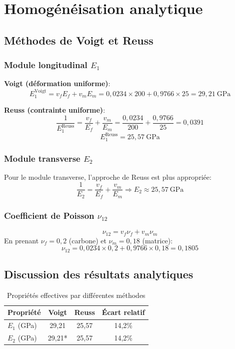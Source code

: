 \documentclass{rapportECL}
\begin{document}
\section{Homogénéisation analytique}

\subsection{Méthodes de Voigt et Reuss}

\subsubsection{Module longitudinal $E_1$}

\textbf{Voigt (déformation uniforme)}:
\[
E_1^{\text{Voigt}} = v_f E_f + v_m E_m = 0,0234 \times 200 + 0,9766 \times 25 = 29,21\ \si{\giga\pascal}
\]

\textbf{Reuss (contrainte uniforme)}:
\[
\frac{1}{E_1^{\text{Reuss}}} = \frac{v_f}{E_f} + \frac{v_m}{E_m} = \frac{0,0234}{200} + \frac{0,9766}{25} = 0,0391
\]
\[
E_1^{\text{Reuss}} = 25,57\ \si{\giga\pascal}
\]

\subsubsection{Module transverse $E_2$}

Pour le module transverse, l'approche de Reuss est plus appropriée:
\[
\frac{1}{E_2} = \frac{v_f}{E_f} + \frac{v_m}{E_m} \Rightarrow E_2 \approx 25,57\ \si{\giga\pascal}
\]

\subsubsection{Coefficient de Poisson $\nu_{12}$}

\[
\nu_{12} = v_f \nu_f + v_m \nu_m
\]
En prenant $\nu_f = 0,2$ (carbone) et $\nu_m = 0,18$ (matrice):
\[
\nu_{12} = 0,0234 \times 0,2 + 0,9766 \times 0,18 = 0,1805
\]

\subsection{Discussion des résultats analytiques}

\begin{table}[h]
\centering
\caption{Propriétés effectives par différentes méthodes}
\begin{tabular}{lccc}
\toprule
Propriété & Voigt & Reuss & Écart relatif \\
\midrule
$E_1$ (GPa) & 29,21 & 25,57 & 14,2\% \\
$E_2$ (GPa) & 29,21* & 25,57 & 14,2\% \\
\bottomrule
\end{tabular}
\end{table}
\end{document}
